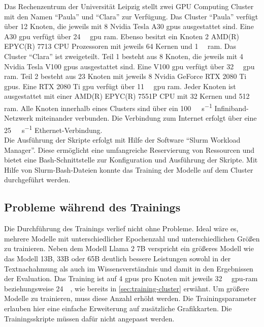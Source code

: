 Das Rechenzentrum der Universität Leipzig stellt zwei GPU Computing Cluster mit den Namen \enquote{Paula} und \enquote{Clara} zur Verfügung.
Das Cluster \enquote{Paula} verfügt über 12 Knoten, die jeweils mit 8 Nvidia Tesla A30 \ac{gpu}s ausgestattet sind.
Eine A30 \ac{gpu} verfügt über \SI{24}{\giga\byte} \ac{gpu} \ac{ram}.
Ebenso besitzt ein Knoten 2 AMD(R) EPYC(R) 7713 CPU Prozessoren mit jeweils 64 Kernen und \SI{1}{\tera\byte} \ac{ram}.
Das Cluster \enquote{Clara} ist zweigeteilt.
Teil 1 besteht aus 8 Knoten, die jeweils mit 4 Nvidia Tesla V100 \ac{gpu}s ausgestattet sind. Eine V100 \ac{gpu} verfügt über \SI{32}{\giga\byte} \ac{gpu} \ac{ram}.
Teil 2 besteht aus 23 Knoten mit jeweils 8 Nvidia GeForce RTX 2080 Ti \ac{gpu}s. Eine RTX 2080 Ti \ac{gpu} verfügt über \SI{11}{\giga\byte} \ac{gpu} \ac{ram}.
Jeder Knoten ist ausgestattet mit einer AMD(R) EPYC(R) 7551P CPU mit 32 Kernen und \SI{512}{\giga\byte} \ac{ram}.
Alle Knoten innerhalb eines Clusters sind über ein \SI{100}{\giga\bit\per\second} Infiniband-Netzwerk miteinander verbunden.
Die Verbindung zum Internet erfolgt über eine \SI{25}{\giga\bit\per\second} Ethernet-Verbindung.\\

Die Ausführung der Skripte erfolgt mit Hilfe der Software \enquote{Slurm Workload Manager}.
Diese ermöglicht eine umfangreiche Reservierung von Ressourcen und bietet eine Bash-Schnittstelle zur Konfiguration und Ausführung der Skripte.
Mit Hilfe von Slurm-Bash-Dateien konnte das Training der Modelle auf dem Cluster durchgeführt werden.\\

\subsection{Probleme während des Trainings}\label{sec:problem-training}
Die Durchführung des Trainings verlief nicht ohne Probleme.
Ideal wäre es, mehrere Modelle mit unterschiedlicher Epochenzahl und unterschiedlichen Größen zu trainieren.
Neben dem Modell Llama 2 7B verspricht ein größeres Modell wie das Modell 13B, 33B oder 65B deutlich bessere Leistungen sowohl in der Textnachahmung als auch im Wissensverständnis und damit in den Ergebnissen der Evaluation.
Das Training ist auf 4 \ac{gpu}s pro Knoten mit jeweils \SI{32}{\giga\byte} \ac{gpu}-\ac{ram} beziehungsweise \SI{24}{\giga\byte}, wie bereits in \cref{sec:training-cluster} erwähnt.
Um größere Modelle zu trainieren, muss diese Anzahl erhöht werden.
Die Trainingsparameter erlauben hier eine einfache Erweiterung auf zusätzliche Grafikkarten.
Die Trainingsskripte müssen dafür nicht angepasst werden.\\

